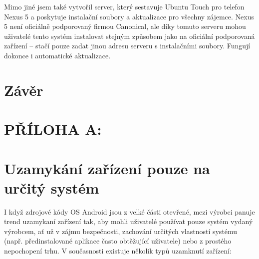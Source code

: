 \documentclass[12pt, a4paper, oneside]{article}
\begin{document}
Mimo jiné jsem také vytvořil server\cite{tasemnice-si-mail}, který sestavuje Ubuntu Touch pro telefon Nexus 5 a poskytuje instalační soubory a aktualizace pro všechny zájemce.  Nexus 5 není oficiálně podporovaný firmou Canonical, ale díky tomuto serveru mohou uživatelé tento systém instalovat stejným způsobem jako na oficiální podporovaná zařízení -- stačí pouze zadat jinou adresu serveru s instalačními soubory. Fungují dokonce i automatické aktualizace.

\newpage
\section*{Závěr}



\newpage
\section*{PŘÍLOHA A:}
\section*{Uzamykání zařízení pouze na určitý systém}
\label{sec:locked}
I když zdrojové kódy OS Android jsou z velké části otevřené, mezi výrobci panuje trend uzamykaní zařízení tak, aby mohli uživatelé používat pouze systém vydaný výrobcem, ať už v zájmu bezpečnosti, zachování určitých vlastností systému (např. předinstalované aplikace často obtěžující uživatele) nebo z prostého nepochopení trhu. V současnosti existuje několik typů uzamknutí zařízení:
\end{document}

